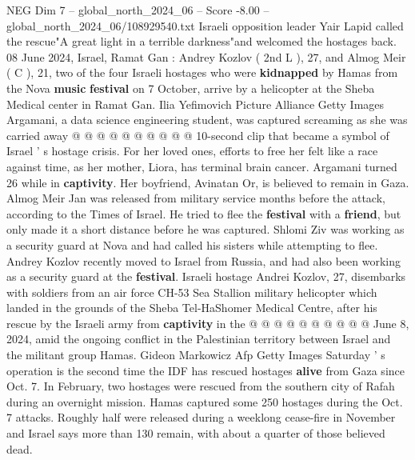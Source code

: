 \begin{textsample}{NEG Dim 7 – global\_north\_2024\_06 – Score -8.00 – global\_north\_2024\_06/108929540.txt}
Israeli opposition leader Yair Lapid called the rescue"A great light in a terrible darkness"and welcomed the hostages back. 08 June 2024, Israel, Ramat Gan : Andrey Kozlov ( 2nd L ), 27, and Almog Meir ( C ), 21, two of the four Israeli hostages who were \textbf{kidnapped} by Hamas from the Nova \textbf{music} \textbf{festival} on 7 October, arrive by a helicopter at the Sheba Medical center in Ramat Gan.
Ilia Yefimovich Picture Alliance Getty Images Argamani, a data science engineering student, was captured screaming as she was carried away @ @ @ @ @ @ @ @ @ @ 10-second clip that became a symbol of Israel ' s hostage crisis.
For her loved ones, efforts to free her felt like a race against time, as her mother, Liora, has terminal brain cancer.
Argamani turned 26 while in \textbf{captivity}.
Her boyfriend, Avinatan Or, is believed to remain in Gaza.
Almog Meir Jan was released from military service months before the attack, according to the Times of Israel.
He tried to flee the \textbf{festival} with a \textbf{friend}, but only made it a short distance before he was captured.
Shlomi Ziv was working as a security guard at Nova and had called his sisters while attempting to flee.
Andrey Kozlov recently moved to Israel from Russia, and had also been working as a security guard at the \textbf{festival}.
Israeli hostage Andrei Kozlov, 27, disembarks with soldiers from an air force CH-53 Sea Stallion military helicopter which landed in the grounds of the Sheba Tel-HaShomer Medical Centre, after his rescue by the Israeli army from \textbf{captivity} in the @ @ @ @ @ @ @ @ @ @ June 8, 2024, amid the ongoing conflict in the Palestinian territory between Israel and the militant group Hamas.
Gideon Markowicz Afp Getty Images Saturday ' s operation is the second time the IDF has rescued hostages \textbf{alive} from Gaza since Oct. 7.
In February, two hostages were rescued from the southern city of Rafah during an overnight mission.
Hamas captured some 250 hostages during the Oct. 7 attacks.
Roughly half were released during a weeklong cease-fire in November and Israel says more than 130 remain, with about a quarter of those believed dead.

\end{textsample}
